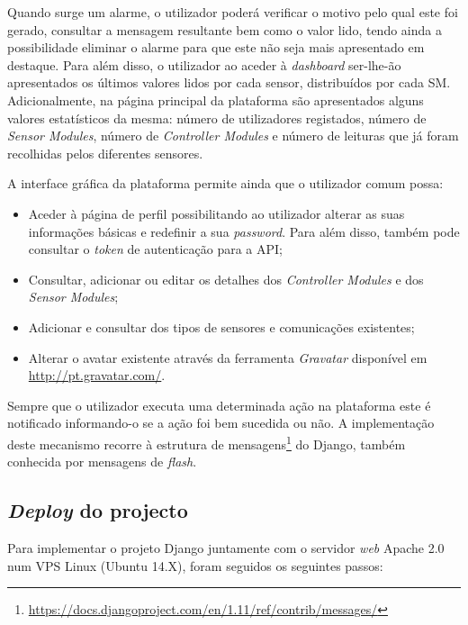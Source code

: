Quando surge um  alarme, o utilizador poderá verificar o motivo pelo qual este foi gerado, consultar a mensagem resultante bem como o valor lido, tendo ainda a possibilidade eliminar o alarme para que este não seja mais apresentado em destaque. Para além disso, o utilizador ao aceder à \textit{dashboard} ser-lhe-ão apresentados os últimos valores lidos por cada sensor, distribuídos por cada \acl{SM}. Adicionalmente, na página principal da plataforma são apresentados alguns valores estatísticos da mesma: número de utilizadores registados, número de \textit{Sensor Modules}, número de \textit{Controller Modules} e número de leituras que já foram recolhidas pelos diferentes sensores. 


A interface gráfica da plataforma permite ainda que o utilizador comum possa: 

\begin{itemize}
	\item Aceder à página de perfil possibilitando ao utilizador alterar as suas informações básicas e redefinir a sua \textit{password}. Para além disso, também pode consultar o \textit{token} de autenticação para a  \ac{API}; 
	
	\item Consultar, adicionar ou editar os detalhes dos \textit{Controller Modules} e dos \textit{Sensor Modules}; 
	
	\item Adicionar e consultar dos tipos de sensores e comunicações existentes; 
	
	\item Alterar o avatar existente através da ferramenta \textit{Gravatar} disponível em \url{http://pt.gravatar.com/}. 
\end{itemize}






Sempre que o utilizador executa uma determinada ação na plataforma este é notificado informando-o se a ação foi bem sucedida ou não. A implementação deste mecanismo recorre à estrutura de mensagens\footnote{\url{https://docs.djangoproject.com/en/1.11/ref/contrib/messages/}} do Django, também conhecida por mensagens de \textit{flash}. 




\subsection{\textit{Deploy} do projecto}

Para implementar o projeto Django juntamente com o servidor \textit{web} Apache 2.0 num \ac{VPS} Linux (Ubuntu 14.X), foram seguidos os seguintes passos: 


